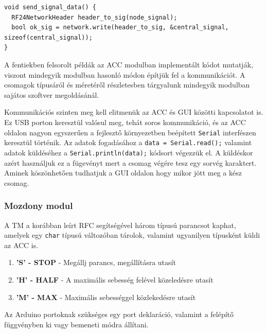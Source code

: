 \documentclass[a4paper,12pt]{article}
\begin{document}
\begin{lstlisting}[style=CStyle, caption={RFC kommunikáció adatok küldése az ACC-ben},label=code:acc_rfc_send]
void send_signal_data() {
  RF24NetworkHeader header_to_sig(node_signal);
  bool ok_sig = network.write(header_to_sig, &central_signal, sizeof(central_signal));
}
\end{lstlisting}

A fentiekben felsorolt példák az ACC modulban implementált kódot mutatják, viszont mindegyik modulban hasonló módon építjük fel a kommunikációt.
A csomagok típusáról és méretéről részletesben tárgyalunk mindegyik modulban sajátos szoftver megoldásánál.

Kommunikációs szinten meg kell elitmenük az ACC és GUI közötti kapcsolatot is. 
Ez USB porton keresztül valósul meg, tehát soros kommunikáció, és az ACC oldalon nagyon egyszerűen a fejlesztő környezetben beépített \texttt{Serial} interfészen keresztül történik.
Az adatok fogadásához a \texttt{data = Serial.read();} valamint adatok küldéséhez a \texttt{Serial.println(data);} kódsort végezzük el. 
A küldéskor azért használjuk ez a fügevényt mert a csomag végére tesz egy sorvég karaktert.
Aminek köszönhetően tudhatjuk a GUI oldalon hogy mikor jött meg a kész csomag.

\subsubsection{Mozdony modul}
A TM a korábban leírt RFC segítségével három típusú parancsot kaphat, amelyek egy \texttt{char} típusú változóban tárolok, valamint ugyanilyen típusként küldi az ACC is. 
\begin{enumerate}
	\item \textbf{'S' - STOP} - Megállj parancs, megállításra utasít 
	\item \textbf{'H' - HALF} - A maximális sebesség felével közeledésre utasít
	\item \textbf{'M' - MAX} -  Maximális sebességgel közlekedésre utasít
\end{enumerate}
Az Arduino portoknak szükséges egy port deklaráció, valamint a felépítő függvényben ki vagy bemeneti módra állítani.
\end{document}
